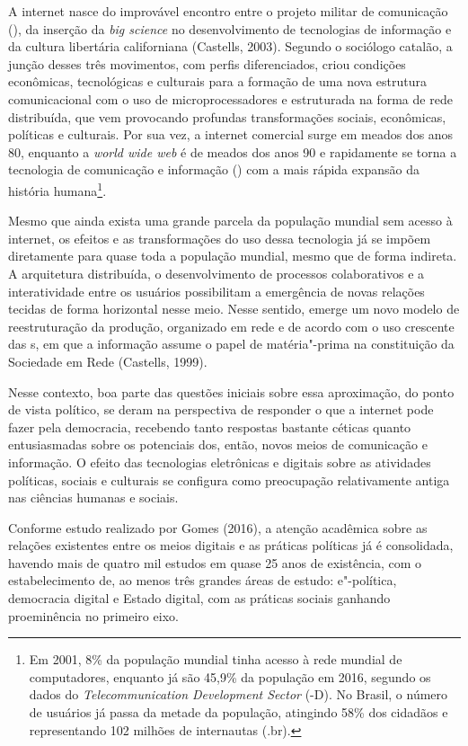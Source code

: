 A internet nasce do improvável encontro entre o projeto militar de
comunicação (), da inserção da \emph{big science} no
desenvolvimento de tecnologias de informação e da cultura libertária
californiana (Castells, 2003). Segundo o sociólogo catalão, a junção
desses três movimentos, com perfis diferenciados, criou condições
econômicas, tecnológicas e culturais para a formação de uma nova
estrutura comunicacional com o uso de microprocessadores e estruturada
na forma de rede distribuída, que vem provocando profundas
transformações sociais, econômicas, políticas e culturais. Por sua vez,
a internet comercial surge em meados dos anos 80, enquanto a \emph{world
wide web} é de meados dos anos 90 e rapidamente se torna a tecnologia de
comunicação e informação () com a mais rápida expansão da história
humana\footnote{Em 2001, 8\% da população mundial tinha acesso à rede
  mundial de computadores, enquanto já são 45,9\% da população em 2016,
  segundo os dados do \emph{Telecommunication Development Sector}
  (-D). No Brasil, o número de usuários já passa da metade da
  população, atingindo 58\% dos cidadãos e representando 102 milhões de
  internautas (.br).}.

Mesmo que ainda exista uma grande parcela da população mundial sem
acesso à internet, os efeitos e as transformações do uso dessa
tecnologia já se impõem diretamente para quase toda a população mundial,
mesmo que de forma indireta. A arquitetura distribuída, o
desenvolvimento de processos colaborativos e a interatividade entre os
usuários possibilitam a emergência de novas relações tecidas de forma
horizontal nesse meio. Nesse sentido, emerge um novo modelo de
reestruturação da produção, organizado em rede e de acordo com o uso
crescente das s, em que a informação assume o papel de matéria"-prima
na constituição da Sociedade em Rede (Castells, 1999).

Nesse contexto, boa parte das questões iniciais sobre essa aproximação,
do ponto de vista político, se deram na perspectiva de responder o que a
internet pode fazer pela democracia, recebendo tanto respostas bastante
céticas quanto entusiasmadas sobre os potenciais dos, então, novos meios
de comunicação e informação. O efeito das tecnologias eletrônicas e
digitais sobre as atividades políticas, sociais e culturais se configura
como preocupação relativamente antiga nas ciências humanas e sociais.

Conforme estudo realizado por Gomes (2016), a atenção acadêmica sobre as
relações existentes entre os meios digitais e as práticas políticas já é
consolidada, havendo mais de quatro mil estudos em quase 25 anos de
existência, com o estabelecimento de, ao menos três grandes áreas de
estudo: e"-política, democracia digital e Estado digital, com as práticas
sociais ganhando proeminência no primeiro eixo.

